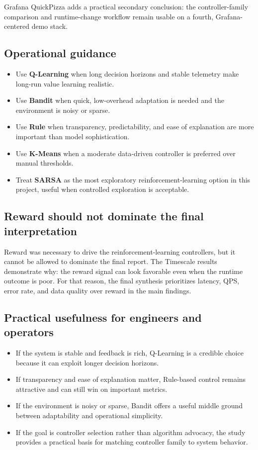 \documentclass[10pt,twocolumn]{article}
\begin{document}
Grafana QuickPizza adds a practical secondary conclusion: the controller-family comparison and runtime-change workflow remain usable on a fourth, Grafana-centered demo stack.

\subsection{Operational guidance}
\begin{itemize}
  \item Use \textbf{Q-Learning} when long decision horizons and stable telemetry make long-run value learning realistic.
  \item Use \textbf{Bandit} when quick, low-overhead adaptation is needed and the environment is noisy or sparse.
  \item Use \textbf{Rule} when transparency, predictability, and ease of explanation are more important than model sophistication.
  \item Use \textbf{K-Means} when a moderate data-driven controller is preferred over manual thresholds.
  \item Treat \textbf{SARSA} as the most exploratory reinforcement-learning option in this project, useful when controlled exploration is acceptable.
\end{itemize}

\subsection{Reward should not dominate the final interpretation}
Reward was necessary to drive the reinforcement-learning controllers, but it cannot be allowed to dominate the final report. The Timescale results demonstrate why: the reward signal can look favorable even when the runtime outcome is poor. For that reason, the final synthesis prioritizes latency, QPS, error rate, and data quality over reward in the main findings.

\subsection{Practical usefulness for engineers and operators}
\begin{itemize}
  \item If the system is stable and feedback is rich, Q-Learning is a credible choice because it can exploit longer decision horizons.
  \item If transparency and ease of explanation matter, Rule-based control remains attractive and can still win on important metrics.
  \item If the environment is noisy or sparse, Bandit offers a useful middle ground between adaptability and operational simplicity.
  \item If the goal is controller selection rather than algorithm advocacy, the study provides a practical basis for matching controller family to system behavior.
\end{itemize}
\end{document}
